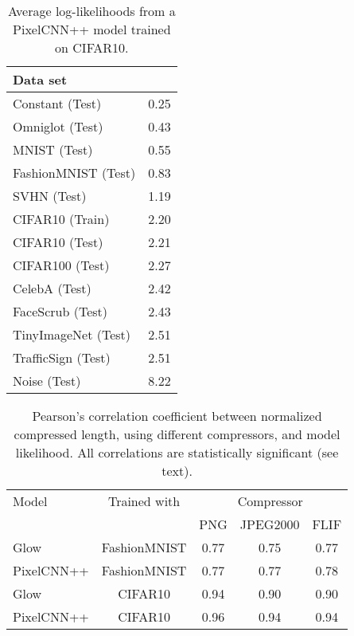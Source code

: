 \documentclass[letterpaper]{article} \usepackage{iclr2020_conference,times}
\begin{document}
\begin{table}[ht]
\caption{Average log-likelihoods from a PixelCNN++ model trained on CIFAR10.}
\label{tab:avgloglike}
\begin{center}
\begin{tabular}{l|c}
\hline
Data set &  \\
\hline
Constant (Test) & 0.25 \\
Omniglot (Test) & 0.43 \\
MNIST (Test) & 0.55 \\
FashionMNIST (Test) & 0.83 \\
SVHN (Test) & 1.19 \\
CIFAR10 (Train) & 2.20 \\
CIFAR10 (Test) & 2.21 \\
CIFAR100 (Test) & 2.27 \\
CelebA (Test) & 2.42 \\
FaceScrub (Test) & 2.43 \\
TinyImageNet (Test) & 2.51 \\
TrafficSign (Test) & 2.51 \\
Noise (Test) & 8.22 \\
\hline
\end{tabular}
\end{center}
\end{table}

\begin{table}[ht]
\caption{Pearson's correlation coefficient between normalized compressed length, using different compressors, and model likelihood. All correlations are statistically significant (see text).}
\label{tab:correlations}
\begin{center}
\begin{tabular}{l|c|ccc}
\hline
Model       & Trained with  & \multicolumn{3}{c}{Compressor} \\
            &               & PNG       & JPEG2000  & FLIF \\
\hline
Glow        & FashionMNIST  & 0.77   & 0.75   & 0.77 \\
PixelCNN++  & FashionMNIST  & 0.77   & 0.77   & 0.78 \\
Glow        & CIFAR10       & 0.94   & 0.90   & 0.90 \\
PixelCNN++  & CIFAR10       & 0.96   & 0.94   & 0.94  \\
\hline
\end{tabular}
\end{center}
\end{table}
\end{document}
